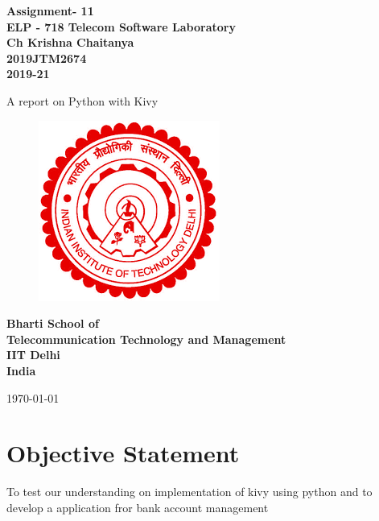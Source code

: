 \documentclass[12pt]{article}
\begin{document}
  \begin{titlepage}
    \begin{center}
      \begin{Large}
      \textbf{ Assignment- 11\\
       \vspace*{0.5cm}
       ELP - 718 Telecom Software Laboratory\\
       \vspace{1cm}
       Ch Krishna Chaitanya\\
       2019JTM2674\\
       2019-21\\}
      \end{Large}
       \vspace{1cm}
      {\Large  A report on Python with Kivy}
       \vfill
       \begin{figure}[h!]
          \centering
          \includegraphics{iitdelhi.png}
       \end{figure}
       \vfill
      \begin{Large}
      \textbf{ Bharti School of \\
       Telecommunication Technology and Management\\
       IIT Delhi\\
       India\\
      }\end{Large}
       \medskip
       \today
    \end{center}
    \vfill
  \end{titlepage}
  
  \tableofcontents
  
  \clearpage
  \section*{Objective Statement}
   To test our understanding on implementation of kivy using python and to develop a application fror bank account management
\end{document}

